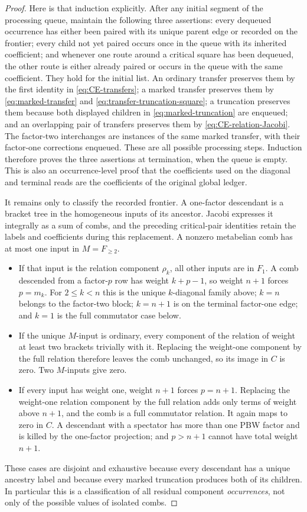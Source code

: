 \documentclass[11pt]{amsart}
\theoremstyle{remark}
\begin{document}
\begin{proof}
Here is that induction explicitly.  After any initial segment of the
processing queue, maintain the following three assertions: every
dequeued occurrence has either been paired with its unique parent edge
or recorded on the frontier; every child not yet paired occurs once in
the queue with its inherited coefficient; and whenever one route around
a critical square has been dequeued, the other route is either already
paired or occurs in the queue with the same coefficient.  They hold for
the initial list.  An ordinary transfer preserves them by the first
identity in \eqref{eq:CE-transfers}; a marked transfer preserves them by
\eqref{eq:marked-transfer} and
\eqref{eq:transfer-truncation-square}; a truncation preserves them
because both displayed children in \eqref{eq:marked-truncation} are
enqueued; and an overlapping pair of transfers preserves them by
\eqref{eq:CE-relation-Jacobi}.  The factor-two interchanges are instances
of the same marked transfer, with their factor-one corrections enqueued.
These are all possible processing steps.  Induction therefore proves
the three assertions at termination, when the queue is empty.  This is
also an occurrence-level proof that the coefficients used on the
diagonal and terminal reads are the coefficients of the original global
ledger.

It remains only to classify the recorded frontier.  A one-factor
descendant is a bracket tree in the homogeneous inputs of its ancestor.
Jacobi expresses it integrally as a sum of combs, and the preceding
critical-pair identities retain the labels and coefficients during this
replacement.  A nonzero metabelian comb has at most one input in
$M=F_{\geq2}$.
\begin{itemize}
\item If that input is the relation component $\rho_k$, all other inputs
are in $F_1$.  A comb descended from a factor-$p$ row has weight
$k+p-1$, so weight $n+1$ forces $p=m_k$.  For $2\leq k<n$ this is the
unique $k$-diagonal family above; $k=n$ belongs to the factor-two block;
$k=n+1$ is on the terminal factor-one edge; and $k=1$ is the full
commutator case below.
\item If the unique $M$-input is ordinary, every component of the
relation of weight at least two brackets trivially with it.  Replacing
the weight-one component by the full relation therefore leaves the comb
unchanged, so its image in $C$ is zero.  Two $M$-inputs give zero.
\item If every input has weight one, weight $n+1$ forces $p=n+1$.
Replacing the weight-one relation component by the full relation adds
only terms of weight above $n+1$, and the comb is a full commutator
relation.  It again maps to zero in $C$.  A descendant with a spectator
has more than one PBW factor and is killed by the one-factor projection;
and $p>n+1$ cannot have total weight $n+1$.
\end{itemize}
These cases are disjoint and exhaustive because every descendant has a
unique ancestry label and because every marked truncation produces both
of its children.  In particular this is a classification of all
residual component \emph{occurrences}, not only of the possible values
of isolated combs.


\end{proof}
\end{document}
